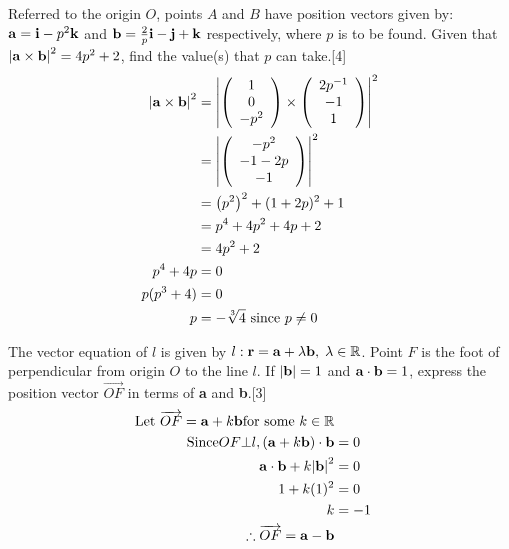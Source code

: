 \documentclass[12pt, a4 paper]{article}
\begin{document}
\begin{outline}[enumerate]
	\color{black}
	\1 Referred to the origin $O$, points $A$ and $B$ have position vectors given by: ${\bf{a}} = {\bf{i}} - {p^2}{\bf{k}}$ and ${\bf{b}} = \frac{2}{p}{\bf{i}} - {\bf{j}} + {\bf{k}}$ respectively, where $p$ is to be found. Given that ${\left| {{\bf{a}} \times {\bf{b}}} \right|^2} = 4{p^2} + 2$, find the value(s) that $p$ can take.\hfill[4]
	\color{blue}
	\begin{align*}
		{\left| {{\bf{a}} \times {\bf{b}}} \right|^2} & = {\left| {\left( {\begin{array}{*{20}{c}}1 \\0\\{ - {p^2}}\end{array}} \right) \times \left( {\begin{array}{*{20}{c}}{2{p^{ - 1}}}\\{ - 1}\\1\end{array}} \right)} \right|^2}\\ &= {\left| {\left( {\begin{array}{*{20}{c}}{ - {p^2}}\\{ - 1 - 2p}\\{ - 1}\end{array}} \right)} \right|^2}\\ &= {\left( {{p^2}} \right)^2} + {(1 + 2p)^2} + 1\\ &= {p^4} + 4{p^2} + 4p + 2\\ &= 4{p^2} + 2\\p^4 + 4p &= 0\\p({p^3} + 4) &= 0\\p &=  - \sqrt[3]{4} \textrm{   since } p \ne 0
	\end{align*}

	\color{black}
	\1 The vector equation of $l$ is given by $l:{\bf{r}} = {\bf{a}} + \lambda {\bf{b}},\;\lambda  \in \mathbb{R}$. Point $F$ is the foot of perpendicular from origin $O$ to the line $l$. If $\left| {\bf{b}} \right| = 1$ and ${\bf{a}} \cdot {\bf{b}} = 1$, express the position vector $\overrightarrow {OF}$ in terms of \textbf{a} and \textbf{b}.\hfill[3]
	\color{blue}
	\begin{align*}
		\textrm{Let }\overrightarrow {OF}  = {\bf{a}} + k{\bf{b}} {\textrm{for some }}k \in \mathbb{R}\\
		\textrm{Since}OF \bot l, ({\bf{a}} + k{\bf{b}}) \cdot {\bf{b}} & = 0 \\{\bf{a}} \cdot {\bf{b}} + k{\left| {\bf{b}} \right|^2} &= 0\\1 + k{(1)^2} &= 0\\k &= -1\\\therefore \overrightarrow {OF}  = {\bf{a}} - {\bf{b}}
	\end{align*}



\end{outline}
\end{document}
